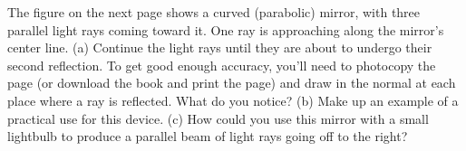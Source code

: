 The  figure on the next page shows a curved (parabolic) mirror, with
three parallel light rays coming toward it. One ray is
approaching along the mirror's center line. (a) Continue the light rays until they
are about to undergo their second reflection.  To get good enough accuracy, you'll need to
photocopy the page (or download the book and print the page)
and draw in the normal at each place where a ray is reflected.
What do you notice?
(b) Make up an example of a practical use for this device.
(c) How could you use this mirror with a small lightbulb to
produce a parallel beam of light rays going off to the right?

